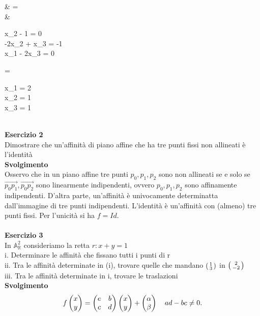 \documentclass[12px]{article}
\begin{document}
\begin{aligend}
	& = \\
	&\begin{cases}
			x_2 - 1 = 0\\
			-2x_2 + x_3 = -1\\
			x_1 - 2x_3 = 0\\
		\end{cases} =
		\begin{cases}
			x_1 = 2\\
			x_2 = 1\\
			x_3 = 1 \\
		\end{cases}
\end{aligend}
\hline \ \\ 
\textbf{Esercizio 2} \\
Dimostrare che un'affinità di piano affine che ha tre punti fissi non allineati è l'identità\\
\textbf{Svolgimento}\\
Osservo che in un piano affine tre punti $p_0,p_1,p_2$ sono non allineati se e solo se $\overrightarrow{p_0p_1}, \overrightarrow{p_0p_2}$ sono linearmente indipendenti, ovvero $p_0,p_1,p_2$ sono affinamente indipendenti. D'altra parte, un'affinità è univocamente determinatta dall'immagine di tre punti indipendenti. L'identità è un'affinità con (almeno) tre punti fissi. Per l'unicità si ha $f=Id$.\\
\hline \ \\
\textbf{Esercizio 3} \\
In $ \mathbb{A} ^2_ \mathbb{R}$ consideriamo la retta $r: x + y =1$\\
i. Determinare le affinità che fissano tutti i punti di r\\
ii. Tra le affinità determinate in (i), trovare quelle che mandano $ \left(\begin{smallmatrix}1\\3\end{smallmatrix}\right) $ in $\left(\begin{smallmatrix}2\\-2\end{smallmatrix}\right)$\\
iii. Tra le affinità determinate in i, trovare le traslazioni\\
\textbf{Svolgimento} \\
\[
	f\begin{pmatrix}x\\y\end{pmatrix} = \begin{pmatrix}e & b \\ c & d\end{pmatrix}\begin{pmatrix}x \\ y\end{pmatrix} + \begin{pmatrix}\alpha \\ \beta\end{pmatrix} \ \ \ ad-bc\neq 0
.\] 
\end{document}
